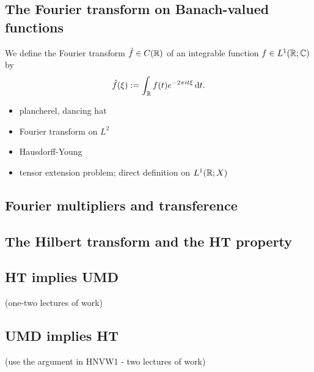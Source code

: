 
\subsection{The Fourier transform on Banach-valued functions}

We define the Fourier transform $\hat{f} \in C(\mathbb{R})$ of an integrable function $f \in L^1(\mathbb{R};\mathbb{C})$ by
\begin{equation*}
  \hat{f}(\xi) := \int_{\mathbb{R}} f(t) e^{-2\pi i t \xi} \, \mathrm{d} t.
\end{equation*}

\begin{itemize}
  \item plancherel, dancing hat
  \item Fourier transform on $L^2$
  \item Hausdorff-Young
  \item tensor extension problem; direct definition on $L^1(\mathbb{R};X)$
\end{itemize}

\subsection{Fourier multipliers and transference}

\subsection{The Hilbert transform and the HT property}

\subsection{HT implies UMD}

(one-two lectures of work)

\subsection{UMD implies HT}

(use the argument in HNVW1 - two lectures of work)



